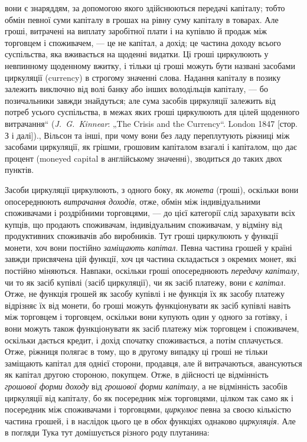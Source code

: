 {вони є знаряддям, за допомогою якого здійснюються передачі капіталу; тобто обмін певної суми
капіталу в грошах на рівну суму капіталу в товарах. Але гроші, витрачені на виплату заробітної плати
і на купівлю
й продаж між торговцем і споживачем, — це не капітал, а дохід; це частина доходу всього суспільства,
яка вживається на щоденні видатки. Ці гроші циркулюють у невпинному щоденному вжитку, і тільки ці
гроші можуть бути названі
засобами циркуляції (currency) в строгому значенні слова. Надання капіталу в
позику залежить виключно від волі банку або інших володільців капіталу, —
бо позичальники завжди знайдуться; але сума засобів циркуляції залежить від
потреб усього суспільства, в межах яких гроші циркулюють для цілей щоденного витрачання“ (\emph{J.~G.~Kinnear}: „The Crisis and the Currency“. London 1847
[стор. З і далі]).}, Вільсон та інші, при чому вони
без ладу переплутують ріжниці між засобами циркуляції, як грішми, грошовим капіталом взагалі і
капіталом, що дає процент (moneyed
capital в англійському значенні), зводиться до таких двох пунктів.

Засоби циркуляції циркулюють, з одного боку, як \emph{монета}
(гроші), оскільки вони опосереднюють \emph{витрачання доходів}, отже,
обмін між індивідуальними споживачами і роздрібними торговцями, — до цієї категорії слід зарахувати
всіх купців, що продають споживачам, індивідуальним споживачам, у відміну від
продуктивних споживачів або виробників. Тут гроші циркулюють
у функції монети, хоч вони постійно \emph{заміщають капітал}.
Певна частина грошей у країні завжди присвячена цій функції,
хоч ця частина складається з окремих монет, які постійно міняються. Навпаки, оскільки гроші
опосереднюють \emph{передачу капіталу}, чи то як засіб купівлі (засіб циркуляції), чи як засіб
платежу, вони є \emph{капітал}. Отже, не функція грошей як засобу
купівлі і не функція їх як засобу платежу відрізняє їх від
монети, бо гроші можуть функціонувати як засіб купівлі навіть
між торговцем і торговцем, оскільки вони купують один у одного
за готівку, і вони можуть також функціонувати як засіб платежу
між торговцем і споживачем, оскільки дається кредит, і дохід спочатку споживається, а потім
сплачується. Отже, ріжниця полягає в тому, що в другому випадку ці гроші не тільки заміщають капітал
для однієї сторони, продавця, але й витрачаються,
авансуються як капітал другою стороною, покупцем. Отже,
в дійсності це відмінність \emph{грошової форми доходу} від \emph{грошової
форми капіталу}, а не відмінність засобів циркуляції від капіталу,
бо як посередник між торговцями, цілком так само як і посередник між споживачами і торговцями,
\emph{циркулює} певна за своєю
кількістю частина грошей, і в наслідок цього це в \emph{обох} функціях однаково \emph{циркуляція}. Але в погляди
Тука тут домішується
різного роду плутанина:

